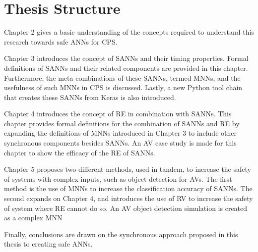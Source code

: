 \section{Thesis Structure}
Chapter 2 gives a basic understanding of the concepts required to understand this research towards safe \acp{ANN} for \ac{CPS}.

Chapter 3 introduces the concept of \acfp{SANN} and their timing properties.
Formal definitions of \acp{SANN} and their related components are provided in this chapter.
Furthermore, the meta combinations of these \acp{SANN}, termed \acp{MNN}, and the usefulness of such \acp{MNN} in \ac{CPS} is discussed.
Lastly, a new Python tool chain that creates these \acp{SANN} from Keras is also introduced.

Chapter 4 introduces the concept of \acf{RE} in combination with \acp{SANN}. 
This chapter provides formal definitions for the combination of \acp{SANN} and \ac{RE} by expanding the definitions of \acp{MNN} introduced in Chapter 3 to include other synchronous components besides \acp{SANN}.
An \acf{AV} case study is made for this chapter to show the efficacy of the \ac{RE} of \acp{SANN}.

Chapter 5 proposes two different methods, used in tandem, to increase the safety of systems with complex inputs, such as object detection for \acp{AV}.
The first method is the use of \acp{MNN} to increase the classification accuracy of \acp{SANN}.
The second expands on Chapter 4, and introduces the use of \ac{RV} to increase the safety of system where \ac{RE} cannot do so.
An \ac{AV} object detection simulation is created as a complex \ac{MNN} 

Finally, conclusions are drawn on the synchronous approach proposed in this thesis to creating safe \acp{ANN}.

